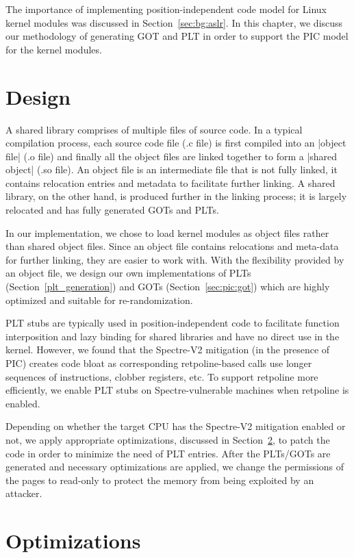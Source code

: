 The importance of implementing position-independent code model for Linux kernel modules was discussed in Section~\ref{sec:bg:aslr}. In this chapter, we discuss our methodology of generating GOT and PLT in order to support the PIC model for the kernel modules.

\section{Design}
A shared library comprises of multiple files of source code. In a typical compilation process, each source code file (.c file) is first compiled into an |object file| (.o file) and finally all the object files are linked together to form a |shared object| (.so file). An object file is an intermediate file that is not fully linked, it contains relocation entries and metadata to facilitate further linking. A shared library, on the other hand, is produced further in the linking process; it is largely relocated and has fully generated GOTs and PLTs.

In our implementation, we chose to load kernel modules as object files rather than shared object files. Since an object file contains relocations and meta-data for further linking, they are easier to work with. With the flexibility provided by an object file, we design our own implementations of PLTs (Section~\ref{plt_generation}) and GOTs (Section~\ref{sec:pic:got}) which are highly optimized and suitable for re-randomization.

PLT stubs are typically used in position-independent code to facilitate function interposition and lazy binding for shared libraries and have no direct use in the kernel. However, we found that the Spectre-V2 mitigation (in the presence of PIC) creates code bloat as corresponding retpoline-based calls use longer sequences of instructions, clobber registers, etc. To support retpoline more efficiently, we enable PLT stubs on Spectre-vulnerable machines when retpoline is enabled.

Depending on whether the target CPU has the Spectre-V2 mitigation enabled or not, we apply appropriate optimizations, discussed in Section~\ref{sec:pic:optimization}, to patch the code in order to minimize the need of PLT entries. After the PLTs/GOTs are generated and necessary optimizations are applied, we change the permissions of the pages to read-only to protect the memory from being exploited by an attacker.


\section{Optimizations}
\label{sec:pic:optimization}
